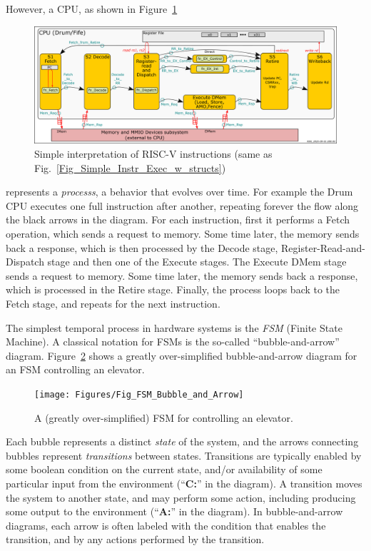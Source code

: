 However, a CPU, as shown in Figure~\ref{Fig_FSMs_Simple_Instr_Exec}
\begin{figure}[htbp]
  \centerline{\includegraphics[width=6in,angle=0]{Figures/RSN_2025-09-01.000.00_FifeDrum_Stages_Multilayer_L1_L3}}
  \caption{\label{Fig_FSMs_Simple_Instr_Exec}
           Simple interpretation of RISC-V instructions
	   (same as Fig.~\ref{Fig_Simple_Instr_Exec_w_structs})}
\end{figure}
represents a \emph{processs}, a behavior that evolves over time.  For
example the Drum CPU executes one full instruction after another,
repeating forever the flow along the black arrows in the diagram. For
each instruction, first it performs a Fetch operation, which sends a
request to memory. Some time later, the memory sends back a response,
which is then processed by the Decode stage,
Register-Read-and-Dispatch stage and then one of the Execute stages.
The Execute DMem stage sends a request to memory. Some time later, the
memory sends back a response, which is processed in the Retire stage.
Finally, the process loops back to the Fetch stage, and repeats for
the next instruction.

The simplest temporal process in hardware systems is the \emph{FSM}
(Finite State Machine).  A classical notation for FSMs is the
so-called ``bubble-and-arrow'' diagram.
Figure~\ref{Fig_FSM_Bubble_and_Arrow} shows a greatly over-simplified
bubble-and-arrow diagram for an FSM controlling an elevator.
\begin{figure}[htbp]
  \centerline{\texttt{[image: Figures/Fig\_FSM\_Bubble\_and\_Arrow]}}
  \caption{\label{Fig_FSM_Bubble_and_Arrow}
           A (greatly over-simplified) FSM for controlling an elevator.}
\end{figure}
Each bubble represents a distinct \emph{state} of the system, and the
arrows connecting bubbles represent \emph{transitions} between states.
Transitions are typically enabled by some boolean condition on the
current state, and/or availability of some particular input from the
environment (``{\bf C:}'' in the diagram).  A transition moves the
system to another state, and may perform some action, including
producing some output to the environment (``{\bf A:}'' in the
diagram).  In bubble-and-arrow diagrams, each arrow is often labeled
with the condition that enables the transition, and by any actions
performed by the transition.

